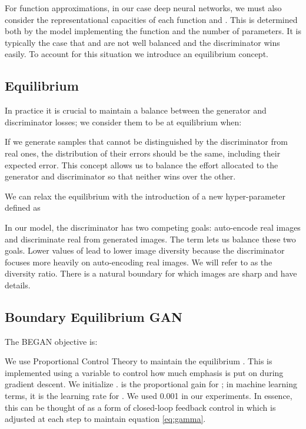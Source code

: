 \documentclass[english]{article}
\begin{document}
For function approximations, in our case deep neural networks, we
must also consider the representational capacities of each function
 and . This is determined both by the model implementing the
function and the number of parameters. It is typically the case that
 and  are not well balanced and the discriminator  wins
easily. To account for this situation we introduce an equilibrium
concept.


\subsection{Equilibrium}

In practice it is crucial to maintain a balance between the generator
and discriminator losses; we consider them to be at equilibrium when:




If we generate samples that cannot be distinguished by the discriminator
from real ones, the distribution of their errors should be the same,
including their expected error. This concept allows us to balance
the effort allocated to the generator and discriminator so that neither
wins over the other.

We can relax the equilibrium with the introduction of a new hyper-parameter
 defined as




In our model, the discriminator has two competing goals: auto-encode
real images and discriminate real from generated images. The 
term lets us balance these two goals. Lower values of  lead
to lower image diversity because the discriminator focuses more heavily
on auto-encoding real images. We will refer to  as the diversity
ratio. There is a natural boundary for which images are sharp and
have details.


\subsection{Boundary Equilibrium GAN}

The BEGAN objective is:




We use Proportional Control Theory to maintain the equilibrium .
This is implemented using a variable  to
control how much emphasis is put on  during
gradient descent. We initialize .  is the
proportional gain for ; in machine learning terms, it is the learning
rate for . We used 0.001 in our experiments. In essence, this
can be thought of as a form of closed-loop feedback control in which
 is adjusted at each step to maintain equation \ref{eq:gamma}.
\end{document}
